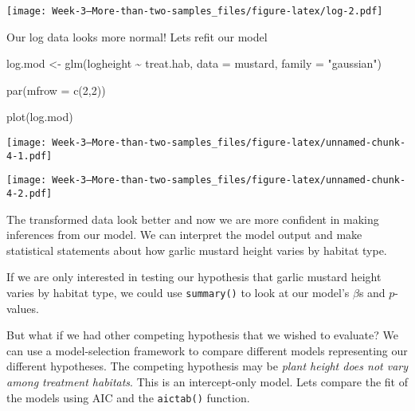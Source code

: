 \documentclass[
]{article}
\newenvironment{Shaded}{\begin{snugshade}}{\end{snugshade}}
\newcommand{\AttributeTok}[1]{\textcolor[rgb]{0.77,0.63,0.00}{#1}}
\newcommand{\DecValTok}[1]{\textcolor[rgb]{0.00,0.00,0.81}{#1}}
\newcommand{\FloatTok}[1]{\textcolor[rgb]{0.00,0.00,0.81}{#1}}
\newcommand{\FunctionTok}[1]{\textcolor[rgb]{0.00,0.00,0.00}{#1}}
\newcommand{\NormalTok}[1]{#1}
\newcommand{\OtherTok}[1]{\textcolor[rgb]{0.56,0.35,0.01}{#1}}
\newcommand{\SpecialCharTok}[1]{\textcolor[rgb]{0.00,0.00,0.00}{#1}}
\newcommand{\StringTok}[1]{\textcolor[rgb]{0.31,0.60,0.02}{#1}}
\begin{document}
\texttt{[image: Week-3---More-than-two-samples\_files/figure-latex/log-2.pdf]}

Our log data looks more normal! Lets refit our model

\begin{Shaded}
\begin{Highlighting}[]
\NormalTok{log.mod }\OtherTok{\textless{}{-}} \FunctionTok{glm}\NormalTok{(logheight }\SpecialCharTok{\textasciitilde{}}\NormalTok{ treat.hab, }\AttributeTok{data =}\NormalTok{ mustard, }\AttributeTok{family =} \StringTok{"gaussian"}\NormalTok{)}

\FunctionTok{par}\NormalTok{(}\AttributeTok{mfrow =} \FunctionTok{c}\NormalTok{(}\DecValTok{2}\NormalTok{,}\DecValTok{2}\NormalTok{))}

\FunctionTok{plot}\NormalTok{(log.mod)}
\end{Highlighting}
\end{Shaded}

\texttt{[image: Week-3---More-than-two-samples\_files/figure-latex/unnamed-chunk-4-1.pdf]}

\begin{Shaded}
\end{Shaded}

\texttt{[image: Week-3---More-than-two-samples\_files/figure-latex/unnamed-chunk-4-2.pdf]}

The transformed data look better and now we are more confident in making
inferences from our model. We can interpret the model output and make
statistical statements about how garlic mustard height varies by habitat
type.

If we are only interested in testing our hypothesis that garlic mustard
height varies by habitat type, we could use \texttt{summary()} to look
at our model's \(\beta\)s and \(p\)-values.

But what if we had other competing hypothesis that we wished to
evaluate? We can use a model-selection framework to compare different
models representing our different hypotheses. The competing hypothesis
may be \emph{plant height does not vary among treatment habitats}. This
is an intercept-only model. Lets compare the fit of the models using AIC
and the \texttt{aictab()} function.
\end{document}
